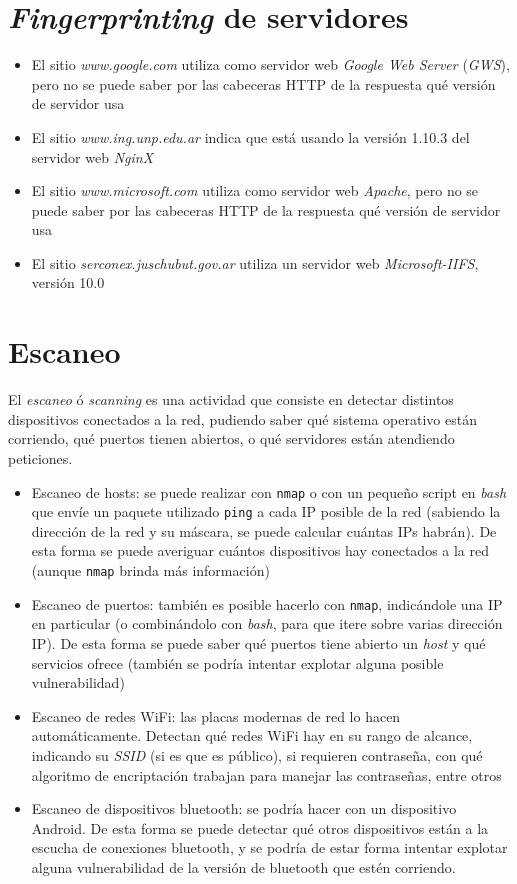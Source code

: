 \section{\emph{Fingerprinting} de servidores}

\begin{itemize}
    \item El sitio \emph{www.google.com} utiliza como servidor web \emph{Google Web Server} (\emph{GWS}), pero no se puede saber por las cabeceras HTTP de la respuesta qué versión de servidor usa
    \item El sitio \emph{www.ing.unp.edu.ar} indica que está usando la versión 1.10.3 del servidor web \emph{NginX}  
    \item El sitio \emph{www.microsoft.com} utiliza como servidor web \emph{Apache}, pero no se puede saber por las cabeceras HTTP de la respuesta qué versión de servidor usa
    \item El sitio \emph{serconex.juschubut.gov.ar} utiliza un servidor web \emph{Microsoft-IIFS}, versión 10.0
\end{itemize}

\section{Escaneo}

El \emph{escaneo} ó \emph{scanning} es una actividad que consiste en detectar distintos dispositivos conectados a la red, pudiendo saber qué sistema operativo están corriendo, qué puertos tienen abiertos, o qué servidores están atendiendo peticiones. 

\begin{itemize}
    \item Escaneo de hosts: se puede realizar con \texttt{nmap} o con un pequeño script en \emph{bash} que envíe un paquete utilizado \texttt{ping} a cada IP posible de la red (sabiendo la dirección de la red y su máscara, se puede calcular cuántas IPs habrán). De esta forma se puede averiguar cuántos dispositivos hay conectados a la red (aunque \texttt{nmap} brinda más información)
    \item Escaneo de puertos: también es posible hacerlo con \texttt{nmap}, indicándole una IP en particular (o combinándolo con \emph{bash}, para que itere sobre varias dirección IP). De esta forma se puede saber qué puertos tiene abierto un \emph{host} y qué servicios ofrece (también se podría intentar explotar alguna posible vulnerabilidad)
    \item Escaneo de redes WiFi: las placas modernas de red lo hacen automáticamente. Detectan qué redes WiFi hay en su rango de alcance, indicando su \emph{SSID} (si es que es público), si requieren contraseña, con qué algoritmo de encriptación trabajan para manejar las contraseñas, entre otros
    \item Escaneo de dispositivos bluetooth: se podría hacer con un dispositivo Android. De esta forma se puede detectar qué otros dispositivos están a la escucha de conexiones bluetooth, y se podría de estar forma intentar explotar alguna vulnerabilidad de la versión de bluetooth que estén corriendo.
\end{itemize}

